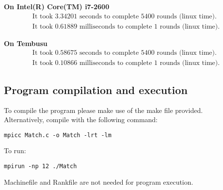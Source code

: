 \documentclass{article}
\begin{document}
\textbf{On Intel(R) Core(TM) i7-2600}
\begin{align*}
\text{It took 3.34201 seconds to complete 5400 rounds (linux time).}\\
\text{It took 0.61889 milliseconds to complete 1 rounds (linux time).}
\end{align*}


\textbf{On Tembusu}
\begin{align*}
\text{It took 0.58675 seconds to complete 5400 rounds (linux time).}\\
\text{It took 0.10866 milliseconds to complete 1 rounds (linux time).}
\end{align*}

\subsection{Program compilation and execution}
To compile the program please make use of the make file provided.\\
Alternatively, compile with the following command:
\begin{verbatim}
mpicc Match.c -o Match -lrt -lm
\end{verbatim}
To run:
\begin{verbatim}
mpirun -np 12 ./Match
\end{verbatim}

Machinefile and Rankfile are not needed for program execution.
\end{document}
